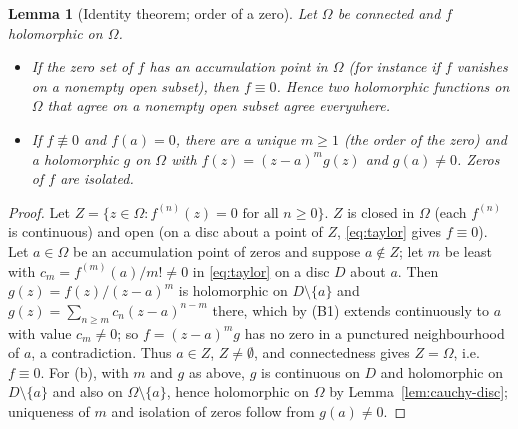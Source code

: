 \documentclass[11pt]{article}
\newtheorem{lemma}[theorem]{Lemma}
\theoremstyle{definition}
\begin{document}
\begin{lemma}[Identity theorem; order of a zero]\label{lem:identity}
Let $\Omega$ be connected and $f$ holomorphic on $\Omega$.
\begin{itemize}
\item[(a)] If the zero set of $f$ has an accumulation point in $\Omega$ (for instance if $f$ vanishes on a nonempty open subset), then $f\equiv0$. Hence two holomorphic functions on $\Omega$ that agree on a nonempty open subset agree everywhere.
\item[(b)] If $f\not\equiv0$ and $f(a)=0$, there are a unique $m\ge1$ (the order of the zero) and a holomorphic $g$ on $\Omega$ with $f(z)=(z-a)^{m}g(z)$ and $g(a)\ne0$. Zeros of $f$ are isolated.
\end{itemize}
\end{lemma}
\begin{proof}
Let $Z=\{z\in\Omega:f^{(n)}(z)=0\text{ for all }n\ge0\}$. $Z$ is closed in $\Omega$ (each $f^{(n)}$ is continuous) and open (on a disc about a point of $Z$, \eqref{eq:taylor} gives $f\equiv0$).
Let $a\in\Omega$ be an accumulation point of zeros and suppose $a\notin Z$; let $m$ be least with $c_m=f^{(m)}(a)/m!\ne0$ in \eqref{eq:taylor} on a disc $D$ about $a$.
Then $g(z)=f(z)/(z-a)^{m}$ is holomorphic on $D\setminus\{a\}$ and $g(z)=\sum_{n\ge m}c_n(z-a)^{n-m}$ there, which by (B1) extends continuously to $a$ with value $c_m\ne0$; so $f=(z-a)^{m}g$ has no zero in a punctured neighbourhood of $a$, a contradiction. Thus $a\in Z$, $Z\ne\emptyset$, and connectedness gives $Z=\Omega$, i.e.\ $f\equiv0$.
For (b), with $m$ and $g$ as above, $g$ is continuous on $D$ and holomorphic on $D\setminus\{a\}$ and also on $\Omega\setminus\{a\}$, hence holomorphic on $\Omega$ by Lemma~\ref{lem:cauchy-disc}; uniqueness of $m$ and isolation of zeros follow from $g(a)\ne0$.
\end{proof}
\end{document}
